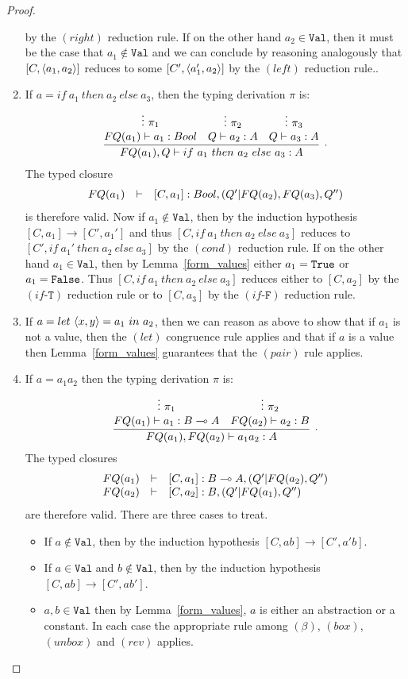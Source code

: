 \documentclass{article}
\begin{document}
\begin{proof}
\begin{enumerate}
  by the $(right)$ reduction rule.
  If on the other hand $a_2\in\mathtt{Val}$, then it must be the case that $a_1\notin\mathtt{Val}$ 
  and we can conclude by reasoning analogously that $[C,\langle a_1,a_2\rangle]$ reduces to 
  some $[C',\langle a_1',a_2\rangle]$ by the $(left)$ reduction rule.. 
  \item If $a=if ~a_1~ then ~a_2~ else ~a_3$, then the typing derivation $\pi$ is:
  \[
  \infer[.]{FQ(a_1),Q\entails if ~a_1~ then ~a_2~ else ~a_3:A}{
    \deduce[]{FQ(a_1)\entails a_1:Bool }{
      \vdots~\pi_1
    }
    &
    \deduce[]{Q \entails a_2:A}{
      \vdots~\pi_2
    }    
    &
    \deduce[]{Q \entails a_3:A}{
      \vdots~\pi_3
    }    
  }
  \]  
  The typed closure
  \[
  \begin{array}{rcl}
  FQ(a_1) & \vdash & [C,a_1]:Bool,(Q'|FQ(a_2),FQ(a_3),Q'')
  \end{array}
  \]
  is therefore valid. Now if $a_1\notin\mathtt{Val}$, then by the induction hypothesis 
  $[C,a_1]\to[C',a_1']$ and thus $[C,if ~a_1~ then ~a_2~ else ~a_3]$ reduces 
  to $[C',if ~a_1'~ then ~a_2~ else ~a_3]$ by the $(cond)$ reduction rule. 
  If on the other hand $a_1\in\mathtt{Val}$, then by 
  Lemma~\hyperref[form_values]{\ref*{form_values}} either $a_1=\texttt{True}$ or $a_1=\texttt{False}$. 
  Thus $[C,if ~a_1~ then ~a_2~ else ~a_3]$ reduces either to $[C,a_2]$ by the 
  $(if\mbox{-}\mathtt{T})$ reduction rule or 
  to $[C,a_3]$ by the $(if\mbox{-}\mathtt{F})$ reduction rule.
  \item If $a=let ~\langle x,y\rangle=a_1~ in ~a_2$, then we can reason as above to show that 
  if $a_1$ is not a value, then the $(let)$ congruence rule applies and that if 
  $a$ is a value then Lemma~\hyperref[form_values]{\ref*{form_values}} 
  guarantees that the $(pair)$ rule applies.
  \item If $a=a_1a_2$ then the typing derivation $\pi$ is: 
  \[
    \infer[.]{FQ(a_1),FQ(a_2)\entails a_1a_2:A}{
      \deduce[]{FQ(a_1)\entails a_1:B\loli A}{
        \vdots~\pi_1
      }
      &
      \deduce[]{FQ(a_2)\entails a_2:B}{
        \vdots~\pi_2
      }      
    }
  \]  
  The typed closures
  \[
  \begin{array}{rcl}
  FQ(a_1) & \vdash & [C,a_1]:B\multimap A,(Q'|FQ(a_2),Q'')\\
  FQ(a_2) & \vdash & [C,a_2]:B, (Q'|FQ(a_1),Q'')
  \end{array}
  \]
  are therefore valid. There are three cases to treat.
  \begin{itemize}
    \item If $a\notin\mathtt{Val}$, then by the induction hypothesis 
    $[C,ab]\to[C',a'b]$.
    \item If $a\in\mathtt{Val}$ and $b\notin\mathtt{Val}$, then by 
    the induction hypothesis $[C,ab]\to[C',ab']$.
    \item $a,b\in\mathtt{Val}$ then by 
    Lemma~\hyperref[form_values]{\ref*{form_values}}, $a$ is either 
    an abstraction or a constant. In each case the appropriate rule 
    among $(\beta)$, $(box)$, $(unbox)$ and $(rev)$ applies. 
  \end{itemize}
\end{enumerate}
\end{proof}
\end{document}

